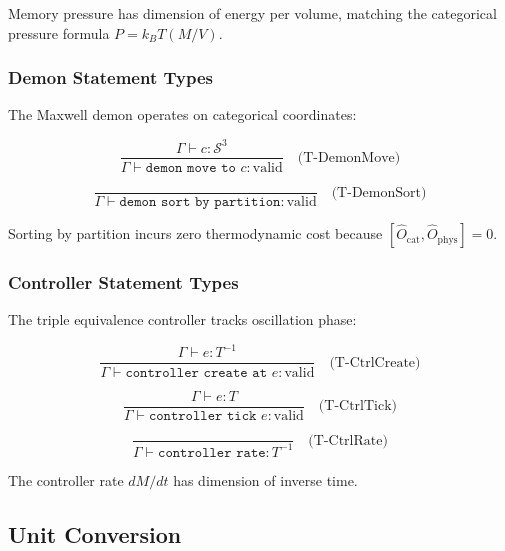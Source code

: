 \documentclass[twocolumn,10pt]{article}
\begin{document}
Memory pressure has dimension of energy per volume, matching the categorical pressure formula $P = k_B T (M/V)$.

\subsubsection{Demon Statement Types}

The Maxwell demon operates on categorical coordinates:

\begin{equation}
    \frac{\Gamma \vdash c : \mathcal{S}^3}{\Gamma \vdash \texttt{demon move to } c : \text{valid}}
    \quad \text{(T-DemonMove)}
\end{equation}

\begin{equation}
    \frac{}{\Gamma \vdash \texttt{demon sort by partition} : \text{valid}}
    \quad \text{(T-DemonSort)}
\end{equation}

Sorting by partition incurs zero thermodynamic cost because $[\hat{O}_{\text{cat}}, \hat{O}_{\text{phys}}] = 0$.

\subsubsection{Controller Statement Types}

The triple equivalence controller tracks oscillation phase:

\begin{equation}
    \frac{\Gamma \vdash e : T^{-1}}{\Gamma \vdash \texttt{controller create at } e : \text{valid}}
    \quad \text{(T-CtrlCreate)}
\end{equation}

\begin{equation}
    \frac{\Gamma \vdash e : T}{\Gamma \vdash \texttt{controller tick } e : \text{valid}}
    \quad \text{(T-CtrlTick)}
\end{equation}

\begin{equation}
    \frac{}{\Gamma \vdash \texttt{controller rate} : T^{-1}}
    \quad \text{(T-CtrlRate)}
\end{equation}

The controller rate $dM/dt$ has dimension of inverse time.

\subsection{Unit Conversion}
\end{document}
